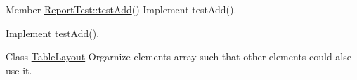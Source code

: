 \begin{DoxyDescription}
\item[Member \hyperlink{class_report_test_afbad58fdd016e59dc660f42cf018daa1}{ReportTest::testAdd}() ]Implement testAdd().

Implement testAdd().
\end{DoxyDescription}

\label{todo__todo000388}
\hypertarget{todo__todo000388}{}
 
\begin{DoxyDescription}
\item[Class \hyperlink{class_table_layout}{TableLayout} ]Orgarnize elements array such that other elements could alse use it. 
\end{DoxyDescription}